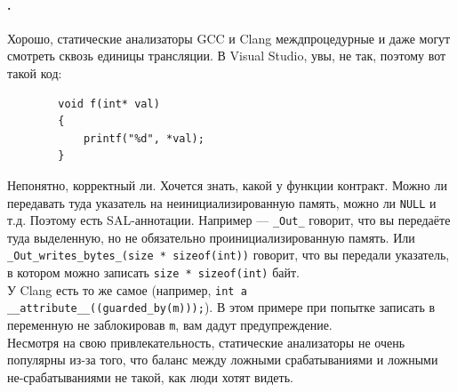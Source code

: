 \documentclass{article}
\begin{document}
    \paragraph{.}
    Хорошо, статические анализаторы GCC и Clang междпроцедурные и даже могут смотреть сквозь единицы трансляции. В Visual Studio, увы, не так, поэтому вот такой код:
    \begin{verbatim}
        void f(int* val)
        {
            printf("%d", *val);
        }
    \end{verbatim}
    Непонятно, корректный ли. Хочется знать, какой у функции контракт. Можно ли передавать туда указатель на неинициализированную память, можно ли \texttt{NULL} и т.д. Поэтому есть SAL-аннотации. Например --- \texttt{_Out_} говорит, что вы передаёте туда выделенную, но не обязательно проинициализированную память. Или \texttt{_Out_writes_bytes_(size * sizeof(int))} говорит, что вы передали указатель, в котором можно записать \texttt{size * sizeof(int)} байт.\\
    У Clang есть то же самое (например, \texttt{int a __attribute__((guarded_by(m)));}). В этом примере при попытке записать в переменную не заблокировав \texttt{m}, вам дадут предупреждение.\\
    Несмотря на свою привлекательность, статические анализаторы не очень популярны из-за того, что баланс между ложными срабатываниями и ложными не-срабатываниями не такой, как люди хотят видеть.
\end{document}
